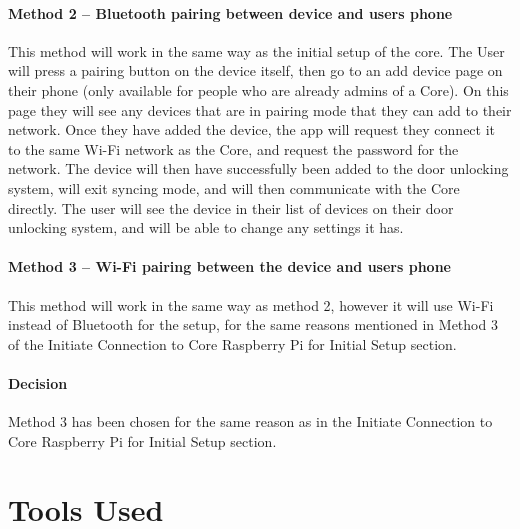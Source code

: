 \paragraph*{Method 2 – Bluetooth pairing between device and users phone}
This method will work in the same way as the initial setup of the core. The User will press a pairing button on the device itself, then go to an add device page on their phone (only available for people who are already admins of a Core). On this page they will see any devices that are in pairing mode that they can add to their network. Once they have added the device, the app will request they connect it to the same Wi-Fi network as the Core, and request the password for the network. The device will then have successfully been added to the door unlocking system, will exit syncing mode, and will then communicate with the Core directly. The user will see the device in their list of devices on their door unlocking system, and will be able to change any settings it has.

\paragraph*{Method 3 – Wi-Fi pairing between the device and users phone}
This method will work in the same way as method 2, however it will use Wi-Fi instead of Bluetooth for the setup, for the same reasons mentioned in Method 3 of the Initiate Connection to Core Raspberry Pi for Initial Setup section.

\paragraph*{Decision}
Method 3 has been chosen for the same reason as in the Initiate Connection to Core Raspberry Pi for Initial Setup section.

\section{Tools Used}

